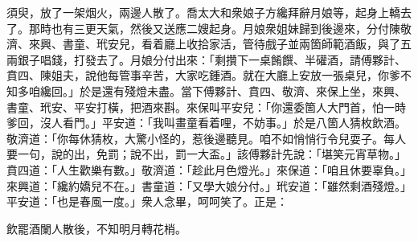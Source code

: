 須臾，放了一架烟火，兩邊人散了。喬太大和衆娘子方纔拜辭月娘等，起身上轎去了。那時也有三更天氣，然後又送應二嫂起身。月娘衆姐妹歸到後邊來，分付陳敬濟、來興、書童、玳安兒，看着廳上收拾家活，管待戲子並兩箇師範酒飯，與了五兩銀子唱錢，打發去了。月娘分付出來：「剩攢下一桌餚饌、半礶酒，請傅夥計、賁四、陳姐夫，說他每管事辛苦，大家吃鍾酒。就在大廳上安放一張桌兒，你爹不知多咱纔回。」於是還有殘燈未盡。當下傅夥計、賁四、敬濟、來保上坐，來興、書童、玳安、平安打橫，把酒來斟。來保叫平安兒：「你還委箇人大門首，怕一時爹回，沒人看門。」平安道：「我叫畫童看着哩，不妨事。」於是八箇人猜枚飲酒。敬濟道：「你每休猜枚，大驚小怪的，惹後邊聽見。咱不如悄悄行令兒耍子。每人要一句，說的出，免罰；說不出，罰一大盃。」該傅夥計先說：「堪笑元宵草物。」賁四道：「人生歡樂有數。」敬濟道：「趁此月色燈光。」來保道：「咱且休要辜負。」來興道：「纔約嬌兒不在。」書童道：「又學大娘分付。」玳安道：「雖然剩酒殘燈。」平安道：「也是春風一度。」衆人念畢，呵呵笑了。正是：

\begin{myquote}
飲罷酒闌人散後，不知明月轉花梢。
\end{myquote}

